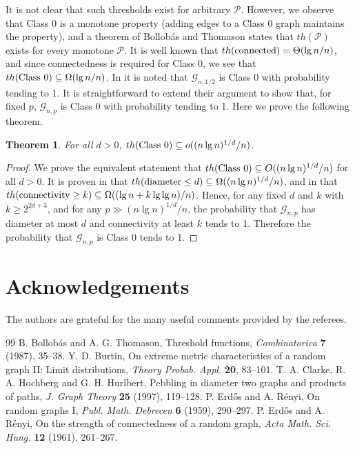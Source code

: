\documentclass{amsart}
\newtheorem{theorem}{Theorem}[section]
\theoremstyle{remark}
\newcommand{\lgn}{\lg n}
\newcommand{\gn}{\mathcal{G}_{n,1/2}}
\newcommand{\gnp}{\mathcal{G}_{n,p}}
\newcommand{\cgQ}{\mathcal{P}}
\begin{document}
It is not clear that such thresholds exist for arbitrary $\cgQ$.
However, we observe that Class 0 is a monotone property (adding edges
to a Class 0 graph maintains the property), and a theorem of Bollob\'as
and Thomason \cite{BT} states that $th(\cgQ)$ exists for every 
monotone $\cgQ$. 
It is well known \cite{ER1} that $th({\rm connected})=\Theta(\lgn /n)$, 
and since connectedness is required for Class 0, we see that 
$th({\rm Class\ 0})\subseteq\Omega(\lgn /n)$.
In \cite{CHH} it is noted that $\gn$ is Class 0 with probability tending to 1.
It is straightforward to extend their argument to show that,
for fixed $p$, $\gnp$ is Class 0 with probability tending to 1.
Here we prove the following theorem.
\begin{theorem}\label{t:cor}
For all $d>0$, $th({\rm Class\ }0)\subseteq o((n\lgn)^{1/d}/n)$.
\end{theorem}
\begin{proof}
We prove the equivalent statement that
$th({\rm Class\ }0)\subseteq O((n\lgn)^{1/d}/n)$ for all $d>0$.
It is proven in \cite{B} that
$th({\rm diameter} \le d)\subseteq\Omega((n\lgn)^{1/d}/n)$,
and in \cite{ER2} that 
$th({\rm connectivity} \ge k)\subseteq\Omega((\lgn +k\lg{\lgn})/n)$.
Hence, for any fixed $d$ and $k$ with $k\ge 2^{2d+3}$, and for any
$p\gg (n\lgn)^{1/d}/n$, the probability that $\gnp$ has diameter at most
$d$ and connectivity at least $k$ tends to 1.
Therefore the probability that $\gnp$ is Class 0 tends to 1.
\end{proof}

\section*{Acknowledgements}
The authors are grateful for the many useful comments provided by the
referees.
\begin{thebibliography}{99}
B. Bollob\'as and A. G. Thomason, 
Threshold functions,
\textit{Combinatorica} \textbf{7} (1987), 35--38.
Y. D. Burtin,
On extreme metric characteristics of a random graph II:
Limit distributions,
\textit{Theory Probab. Appl.} \textbf{20}, 83--101.
T. A. Clarke, R. A. Hochberg and G. H. Hurlbert,
Pebbling in diameter two graphs and products of paths,
\textit{J. Graph Theory} \textbf{25} (1997), 119--128.
P. Erd\H os and A. R\'enyi,
On random graphs I,
\textit{Publ. Math. Debrecen} \textbf{6} (1959), 290--297.
P. Erd\H os and A. R\'enyi,
On the strength of connectedness of a random graph,
\textit{Acta Math. Sci. Hung.} \textbf{12} (1961), 261--267.
\end{thebibliography}
\end{document}
